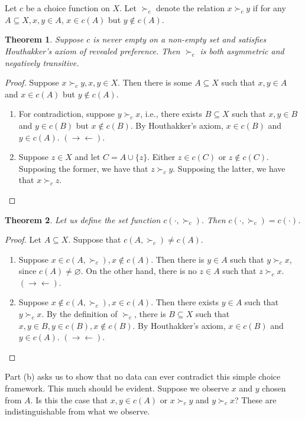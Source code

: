 \documentclass[12pt]{article}
\newtheorem{thm}{Theorem}[section]
\theoremstyle{definition}
\theoremstyle{remark}
\def\contra{\rightarrow \leftarrow}
\def\empty{\varnothing}
\begin{document}
\section{}
Let $c$ be a choice function on $X$. Let $\succ_c$ denote the relation $x \succ_c y$ if for any $A \subseteq X, x,y \in A$, $x \in c(A)$ but $y \notin c(A)$.
\begin{thm}
  Suppose $c$ is never empty on a non-empty set and satisfies Houthakker's axiom of revealed preference. Then $\succ_c$ is both asymmetric and negatively transitive.
\end{thm}
\begin{proof}
  Suppose $x \succ_c y, x,y \in X$. Then there is some $A \subseteq X$ such that $x,y \in A$ and $x \in c(A)$ but $y \notin c(A)$.
  \begin{enumerate}
    \item For contradiction, suppose $y \succ_c x$, i.e., there exists $B \subseteq X$ such that $x,y \in B$ and $y \in c(B)$ but $x \notin c(B)$. By Houthakker's axiom, $x \in c(B)$ and $y \in c(A)$. $(\contra)$.
    \item Suppose $z \in X$ and let $C = A \cup \{ z \}$. Either $z \in c(C)$ or $z \notin c(C)$. Supposing the former, we have that $z \succ_c y$. Supposing the latter, we have that $x \succ_c z$.
  \end{enumerate}
\end{proof}
\begin{thm}
  Let us define the set function $c(\cdot, \succ_c)$. Then $c(\cdot, \succ_c) = c(\cdot)$.
\end{thm}
\begin{proof}
  Let $A \subseteq X$. Suppose that $c(A, \succ_c) \neq c(A)$.
  \begin{enumerate}
    \item Suppose $x \in c(A, \succ_c), x \notin c(A)$. Then there is $y \in A$ such that $y \succ_c x$, since $c(A) \neq \empty$. On the other hand, there is no $z \in A$ such that $z \succ_c x$. $(\contra)$.
    \item Suppose $x \notin c(A, \succ_c), x \in c(A)$. Then there exists $y \in A$ such that $y \succ_c x$. By the definition of $\succ_c$, there is $B \subseteq X$ such that $x,y \in B, y \in c(B), x \notin c(B)$. By Houthakker's axiom, $x \in c(B)$ and $y \in c(A)$. $(\contra)$.
  \end{enumerate}
\end{proof}
Part (b) asks us to show that no data can ever contradict this simple choice framework. This much should be evident. Suppose we observe $x$ and $y$ chosen from $A$. Is this the case that $x,y \in c(A)$ or $x \succ_c y$ and $y \succ_c x$? These are indistinguishable from what we observe.
\end{document}
